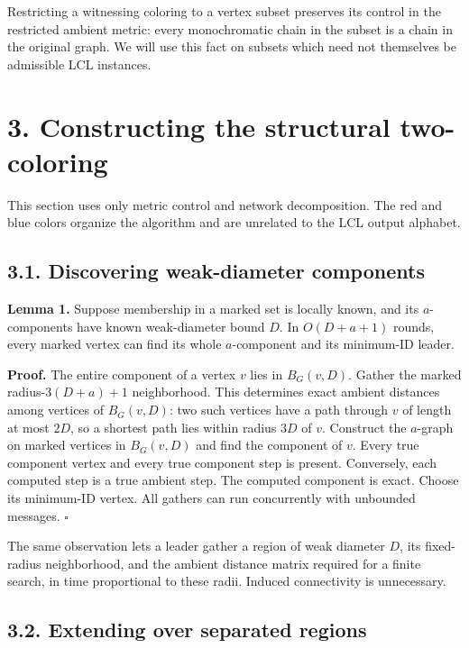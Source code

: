 \documentclass[11pt,a4paper]{article}
\begin{document}
Restricting a witnessing coloring to a vertex subset preserves its control in the restricted ambient metric: every monochromatic chain in the subset is a chain in the original graph.
We will use this fact on subsets which need not themselves be admissible LCL instances.

\section{3. Constructing the structural two-coloring}\label{constructing-the-structural-two-coloring}

This section uses only metric control and network decomposition.
The red and blue colors organize the algorithm and are unrelated to the LCL output alphabet.

\subsection{3.1. Discovering weak-diameter components}\label{discovering-weak-diameter-components}

\textbf{Lemma 1.} Suppose membership in a marked set is locally known, and its \(a\)-components have known weak-diameter bound \(D\).
In \(O(D+a+1)\) rounds, every marked vertex can find its whole \(a\)-component and its minimum-ID leader.

\textbf{Proof.} The entire component of a vertex \(v\) lies in \(B_G(v,D)\).
Gather the marked radius-\(3(D+a)+1\) neighborhood.
This determines exact ambient distances among vertices of \(B_G(v,D)\): two such vertices have a path through \(v\) of length at most \(2D\), so a shortest path lies within radius \(3D\) of \(v\).
Construct the \(a\)-graph on marked vertices in \(B_G(v,D)\) and find the component of \(v\).
Every true component vertex and every true component step is present.
Conversely, each computed step is a true ambient step.
The computed component is exact.
Choose its minimum-ID vertex.
All gathers can run concurrently with unbounded messages. \(\square\)

The same observation lets a leader gather a region of weak diameter \(D\), its fixed-radius neighborhood, and the ambient distance matrix required for a finite search, in time proportional to these radii.
Induced connectivity is unnecessary.

\subsection{3.2. Extending over separated regions}\label{extending-over-separated-regions}
\end{document}
